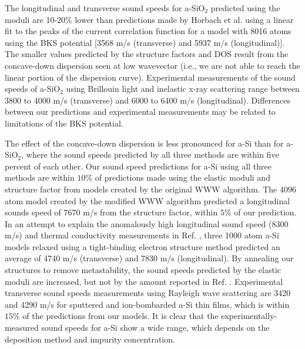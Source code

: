 \documentclass[aps,prb,onecolumn,preprint,superscriptaddress,footinbib,amsmath,amssymb,floatfix]{revtex4}
\begin{document}
The longitudinal and transverse sound speeds for 
a-SiO$_2$ predicted using the moduli are 10-20\%  
lower than predictions made by Horbach et al. using a linear fit 
to the peaks of the 
current correlation function for a model with 
8016 atoms using the BKS potential 
[3568 m/s (transverse) and 5937 m/s (longitudinal)].
\cite{horbach_high_2001} The smaller 
values predicted by the structure factors and DOS 
result from the concave-down dispersion seen at low 
wavevector (i.e., we are not able to reach 
the linear portion of the dispersion curve). 
Experimental measurements of the sound speeds of a-SiO$_2$ 
using Brillouin light and inelastic x-ray 
scattering range between 3800 to 4000 m/s (transverse) and 
6000 to 6400 m/s (longitudinal).
\cite{ruocco_high-frequency_2001,polian_elastic_2002,
ruzicka_evidence_2004} Differences between our predictions and 
experimental measurements may be related to limitations of the 
BKS potential.

The effect of the concave-down dispersion
is less pronounced for a-Si than for a-SiO$_2$, where the sound speeds 
predicted by all three methods are within five percent of each other. 
Our sound speed predictions for a-Si using all three methods
are within $10\%$ of predictions made using the elastic moduli
\cite{kluge_elastic_1988,feldman_elastic_1991} 
and structure factor\cite{feldman_calculations_2002} 
from models created by the original WWW algorithm.
\cite{wooten_computer_1985} 
The 4096 atom model created by the modified WWW algorithm 
\cite{barkema_high-quality_2000} predicted a longitudinal sounds 
speed of 7670 m/s from the structure factor,
\cite{christie_vibrational_2007} within $5\%$ of our prediction. 
In an attempt to explain the 
anomalously high longitudinal sound speed (8300 m/s) and 
thermal conductivity measurements in Ref. , 
three 1000 atom a-Si models relaxed using a tight-binding electron 
structure method predicted an average of 4740 m/s (transverse) and 
7830 m/s (longitudinal).\cite{liu_high_2009} By annealing our 
structures to remove metastability, 
the sound speeds predicted by the elastic moduli are increased, but 
not by the amount reported in Ref. . 
Experimental transverse sound speeds measurements using Rayleigh wave 
scattering are 3420 and 4290 m/s for sputtered 
and ion-bombarded a-Si thin films,\cite{vacher_attenuation_1980} which 
is within $15\%$ of the predictions from our models. 
It is clear that the experimentally-measured sound speeds for a-Si 
show a wide range, which depends on the deposition method and impurity 
concentration.
\cite{vacher_attenuation_1980,liu_high_2009,yang_anomalously_2010}
\end{document}
